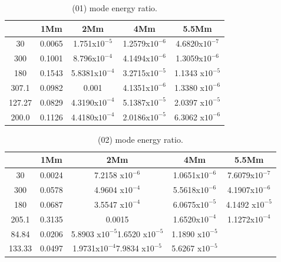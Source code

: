 \documentclass[final,1p]{elsarticle}
\begin{document}
\begin{table}
\centering
\begin{tabular}{c c c c c }
\hline
   &  1Mm & 2Mm & 4Mm & 5.5Mm \\
\hline
30 &  0.0065 & 1.751x$10^{-5}$ &  1.2579x$10^{-6}$ & 4.6820x$10^{-7}$ \\
\hline
300 & 0.1001 & 8.796x$10^{-4}$ &  4.1494x$10^{-6}$ &  1.3059x$10^{-6}$ \\
\hline
180 & 0.1543 &  5.8381x$10^{-4}$ &  3.2715x$10^{-5}$ &  1.1343 x$10^{-5}$ \\
\hline
307.1 & 0.0982 & 0.001 & 4.1351x$10^{-6}$ & 1.3380 x$10^{-6}$  \\
\hline
127.27 & 0.0829 &  4.3190x$10^{-4}$ &  5.1387x$10^{-5}$ & 2.0397 x$10^{-5}$ \\ 
\hline
200.0 & 0.1126 &  4.4180x$10^{-4}$ &  2.0186x$10^{-5}$ & 6.3062 x$10^{-6}$ \\
\hline
\end{tabular} 
\caption{ (01) mode energy ratio.}
\end{table}







\begin{table}
\centering
\begin{tabular}{c c c c c }
\hline
   &  1Mm & 2Mm & 4Mm & 5.5Mm \\
\hline
30 &  0.0024 & 7.2158 x$10^{-6}$ & 1.0651x$10^{-6}$ & 7.6079x$10^{-7}$\\
\hline
300 & 0.0578 & 4.9604 x$10^{-4}$ & 5.5618x$10^{-6}$ & 4.1907x$10^{-6}$\\
\hline
180 & 0.0687 & 3.5547 x$10^{-4}$ & 6.0675x$10^{-5}$ & 4.1492 x$10^{-5}$\\
\hline
205.1 & 0.3135 & 0.0015 &1.6520x$10^{-4}$ & 1.1272x$10^{-4}$\\
\hline
84.84 & 0.0206 &5.8903 x$10^{-5}$1.6520 x$10^{-5}$ & 1.1890 x$10^{-5}$\\
\hline
133.33 & 0.0497 & 1.9731x$10^{-4}$7.9834 x$10^{-5}$ & 5.6267 x$10^{-5}$\\
\hline
\end{tabular} 
\caption{ (02) mode energy ratio.}
\end{table}
\end{document}
